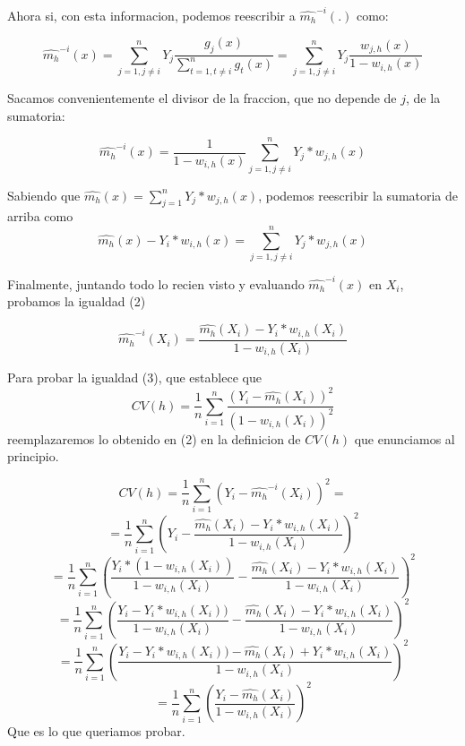 \documentclass{article}
\begin{document}
$$$$

Ahora si, con esta informacion, podemos reescribir a $\widehat{m_h}^{-i}(.)$ como:

$$\widehat{m_h}^{-i}(x) =  \sum_{j=1, j \neq i}^n Y_j \frac{g_j(x)}{\sum\limits_{t=1,t\neq i}^n g_t(x)} = \sum_{j=1, j \neq i}^n Y_j \frac{w_{j,h}(x)}{1-w_{i,h}(x)}$$

Sacamos convenientemente el divisor de la fraccion, que no depende de $j$, de la sumatoria:

$$\widehat{m_h}^{-i}(x) = \frac{1}{1-w_{i,h}(x)} \sum_{j=1, j \neq i}^n Y_j *w_{j,h}(x)$$

Sabiendo que $\widehat{m_h}(x) = \sum_{j=1}^n Y_j *w_{j,h}(x)$, podemos reescribir la sumatoria de arriba como $$\widehat{m_h}(x) - Y_i*w_{i,h}(x) = \sum_{j=1, j\neq i}^n Y_j *w_{j,h}(x)$$

Finalmente, juntando todo lo recien visto y evaluando $\widehat{m_h}^{-i}(x)$ en $X_i$, probamos la igualdad (2)

$$\widehat{m_h}^{-i}(X_i) = \frac{\widehat{m_h}(X_i) - Y_i*w_{i,h}(X_i)}{1-w_{i,h}(X_i)}$$

\pagebreak

Para probar la igualdad (3), que establece que
$$
CV(h) = \frac{1}{n}\sum_{i=1}^n \frac{(Y_i - \widehat{m_h}(X_i))^2 }{(1-w_{i,h}(X_i))^2}
$$
reemplazaremos lo obtenido en (2) en la definicion de $CV(h)$ que enunciamos al principio.

$$CV(h) = \frac{1}{n}\sum_{i=1}^n (Y_i - \widehat{m_h}^{-i}(X_i))^2 = 
$$
$$
= \frac{1}{n}\sum_{i=1}^n \left(Y_i - \frac{\widehat{m_h}(X_i) - Y_i*w_{i,h}(X_i)}{1-w_{i,h}(X_i)}\right)^2 
$$
$$
= \frac{1}{n}\sum_{i=1}^n \left(\frac{Y_i * (1 - w_{i,h}(X_i))}{1 - w_{i,h}(X_i)} - \frac{\widehat{m_h}(X_i) - Y_i*w_{i,h}(X_i)}{1-w_{i,h}(X_i)}\right)^2
$$
$$
= \frac{1}{n}\sum_{i=1}^n \left(\frac{Y_i - Y_i  *  w_{i,h}(X_i))}{1 - w_{i,h}(X_i)} - \frac{\widehat{m_h}(X_i) - Y_i*w_{i,h}(X_i)}{1-w_{i,h}(X_i)}\right)^2
$$
$$
= \frac{1}{n}\sum_{i=1}^n \left(\frac{Y_i - Y_i  *  w_{i,h}(X_i)) - \widehat{m_h}(X_i) + Y_i*w_{i,h}(X_i)}{1 - w_{i,h}(X_i)}\right)^2
$$
$$
= \frac{1}{n}\sum_{i=1}^n \left(\frac{Y_i - \widehat{m_h}(X_i)}{1 - w_{i,h}(X_i)}\right)^2
$$
Que es lo que queriamos probar.
\end{document}
